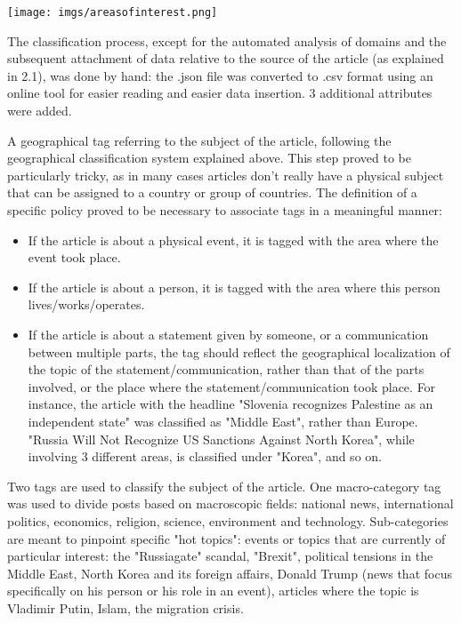 \documentclass{article}
\begin{document}
\texttt{[image: imgs/areasofinterest.png]}

The classification process, except for the automated analysis of domains and the subsequent attachment of data relative to the source of the article  (as explained in 2.1), was done by hand: the .json file was converted to .csv format using an online tool \cite{jsoncsv} for easier reading and easier data insertion. 3 additional attributes were added.

A geographical tag referring to the subject of the article, following the geographical classification system explained above. This step proved to be particularly tricky, as in many cases articles don't really have a physical subject that can be assigned to a country or group of countries. The definition of a specific policy proved to be necessary to associate tags in a meaningful manner:
\begin{itemize}
\item If the article is about a physical event, it is tagged with the area where the event took place.
\item If the article is about a person, it is tagged with the area where this person lives/works/operates.
\item If the article is about a statement given by someone, or a communication between multiple parts, the tag should reflect the geographical localization of the topic of the statement/communication, rather than that of the parts involved, or the place where the statement/communication took place. For instance, the article with the headline "Slovenia recognizes Palestine as an independent state" was classified as "Middle East", rather than Europe. "Russia Will Not Recognize US Sanctions Against North Korea", while involving 3 different areas, is classified under "Korea", and so on.
\end{itemize}

Two tags are used to classify the subject of the article. One macro-category tag was used to divide posts based on macroscopic fields: national news, international politics, economics, religion, science, environment and technology. Sub-categories are meant to pinpoint specific "hot topics": events or topics that are currently of particular interest: the "Russiagate" scandal, "Brexit", political tensions in the Middle East, North Korea and its foreign affairs, Donald Trump (news that focus specifically on his person or his role in an event), articles where the topic is Vladimir Putin, Islam, the migration crisis.
\end{document}

